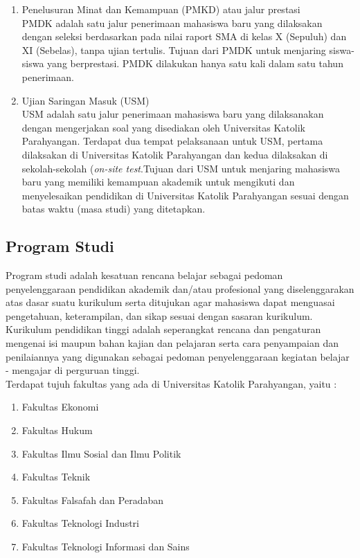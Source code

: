 \begin{enumerate}
	\item Penelusuran Minat dan Kemampuan (PMKD) atau jalur prestasi\\
		PMDK adalah satu jalur penerimaan mahasiswa baru yang dilaksakan dengan seleksi berdasarkan pada nilai raport SMA di kelas X (Sepuluh) dan XI (Sebelas), tanpa ujian tertulis. Tujuan dari PMDK untuk menjaring siswa-siswa yang berprestasi. PMDK dilakukan hanya satu kali dalam satu tahun penerimaan.
		
	\item Ujian Saringan Masuk (USM)\\
		USM adalah satu jalur penerimaan mahasiswa baru yang dilaksanakan dengan mengerjakan soal yang disediakan oleh Universitas Katolik Parahyangan. Terdapat dua tempat pelaksanaan untuk USM, pertama dilaksakan di Universitas Katolik Parahyangan dan kedua dilaksakan di sekolah-sekolah (\textit{on-site test}.Tujuan dari USM untuk menjaring mahasiswa baru yang memiliki kemampuan akademik untuk mengikuti dan menyelesaikan pendidikan di Universitas Katolik Parahyangan sesuai dengan batas waktu (masa studi) yang ditetapkan.
	
\end{enumerate}

\subsection{Program Studi}
\label{sec:program studi} 
Program studi adalah kesatuan rencana belajar sebagai pedoman penyelenggaraan pendidikan akademik dan/atau profesional yang diselenggarakan atas dasar suatu kurikulum serta ditujukan agar mahasiswa dapat menguasai pengetahuan, keterampilan, dan sikap sesuai dengan sasaran kurikulum. Kurikulum pendidikan tinggi adalah seperangkat rencana dan pengaturan mengenai isi maupun bahan kajian dan pelajaran serta cara penyampaian dan penilaiannya yang digunakan sebagai pedoman penyelenggaraan kegiatan belajar - mengajar di perguruan tinggi. \\ %

Terdapat tujuh fakultas yang ada di Universitas Katolik Parahyangan, yaitu :
	\begin{enumerate}
		\item Fakultas Ekonomi 
		\item Fakultas Hukum
		\item Fakultas Ilmu Sosial dan Ilmu Politik
		\item Fakultas Teknik
		\item Fakultas Falsafah dan Peradaban
		\item Fakultas Teknologi Industri
		\item Fakultas Teknologi Informasi dan Sains
	\end{enumerate}\leavevmode
	
